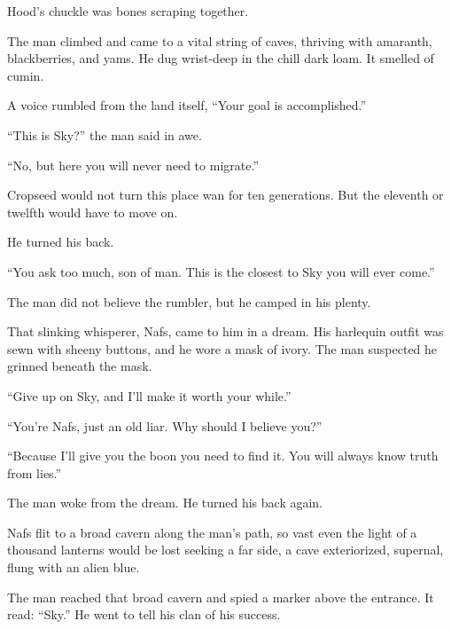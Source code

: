 Hood's chuckle was bones scraping together.

The man climbed and came to a vital string of caves, thriving with
amaranth, blackberries, and yams. He dug wrist-deep in the chill dark
loam. It smelled of cumin.

A voice rumbled from the land itself, ``Your goal is accomplished.''

``This is Sky?'' the man said in awe.

``No, but here you will never need to migrate.''

Cropseed would not turn this place wan for ten generations. But the
eleventh or twelfth would have to move on.

He turned his back.

``You ask too much, son of man. This is the closest to Sky you will ever
come.''

The man did not believe the rumbler, but he camped in his plenty.

That slinking whisperer, Nafs, came to him in a dream. His harlequin
outfit was sewn with sheeny buttons, and he wore a mask of ivory. The
man suspected he grinned beneath the mask.

``Give up on Sky, and I'll make it worth your while.''

``You're Nafs, just an old liar. Why should I believe you?''

``Because I'll give you the boon you need to find it. You will always
know truth from lies.''

The man woke from the dream. He turned his back again.

Nafs flit to a broad cavern along the man's path, so vast even the light
of a thousand lanterns would be lost seeking a far side, a cave
exteriorized, supernal, flung with an alien blue.

The man reached that broad cavern and spied a marker above the entrance.
It read: ``Sky.'' He went to tell his clan of his success.
